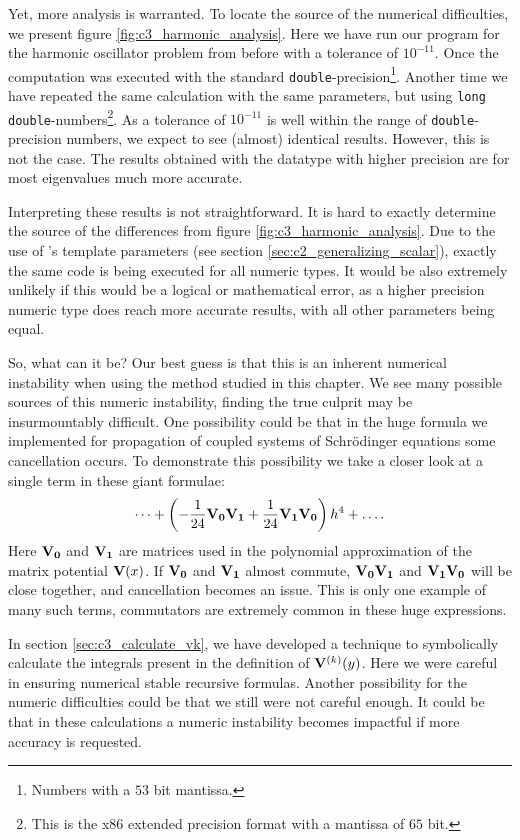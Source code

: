 Yet, more analysis is warranted. To locate the source of the numerical difficulties, we present figure \ref{fig:c3_harmonic_analysis}. Here we have run our program  for the harmonic oscillator problem from before with a tolerance of $10^{-11}$. Once the computation was executed with the standard \texttt{double}-precision\footnote{Numbers with a $53$ bit mantissa.}. Another time we have repeated the same calculation with the same parameters, but using \texttt{long double}-numbers\footnote{This is the x86 extended precision format with a mantissa of $65$ bit.}. As a tolerance of $10^{-11}$ is well within the range of \texttt{double}-precision numbers, we expect to see (almost) identical results. However, this is not the case. The results obtained with the datatype with higher precision are for most eigenvalues much more accurate.

Interpreting these results is not straightforward. It is hard to exactly determine the source of the differences from figure \ref{fig:c3_harmonic_analysis}. Due to the use of \cpp{}'s template parameters (see section \ref{sec:c2_generalizing_scalar}), exactly the same code is being executed for all numeric types. It would be also extremely unlikely if this would be a logical or mathematical error, as a higher precision numeric type does reach more accurate results, with all other parameters being equal.

So, what can it be? Our best guess is that this is an inherent numerical instability when using the method studied in this chapter. We see many possible sources of this numeric instability, finding the true culprit may be insurmountably difficult. One possibility could be that in the huge formula we implemented for propagation of coupled systems of Schrödinger equations some cancellation occurs. To demonstrate this possibility we take a closer look at a single term in these giant formulae:
$$
  \dots + \left(-\frac{1}{24}\vb{V_0}\vb{V_1} + \frac{1}{24} \vb{V_1}\vb{V_0}\right) h^4 + \dots \text{.}
$$
Here $\vb{V_0}$ and $\vb{V_1}$ are matrices used in the polynomial approximation of the matrix potential $\vb{V}(x)$. If $\vb{V_0}$ and $\vb{V_1}$ almost commute, $\vb{V_0}\vb{V_1}$ and $\vb{V_1}\vb{V_0}$ will be close together, and cancellation becomes an issue. This is only one example of many such terms, commutators are extremely common in these huge expressions.

In section \ref{sec:c3_calculate_vk}, we have developed a technique to symbolically calculate the integrals present in the definition of $\vb{V}^{(k)}(y)$. Here we were careful in ensuring numerical stable recursive formulas. Another possibility for the numeric difficulties could be that we still were not careful enough. It could be that in these calculations a numeric instability becomes impactful if more accuracy is requested.

